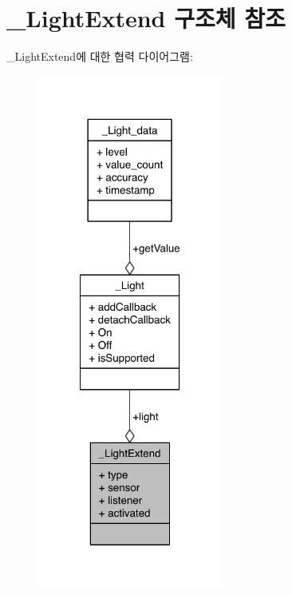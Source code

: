\hypertarget{struct__LightExtend}{\section{\-\_\-\-Light\-Extend 구조체 참조}
\label{struct__LightExtend}
}


\-\_\-\-Light\-Extend에 대한 협력 다이어그램\-:\nopagebreak
\begin{figure}[H]
\begin{center}
\leavevmode
\includegraphics[width=173pt]{d7/d0c/struct__LightExtend__coll__graph}
\end{center}
\end{figure}

